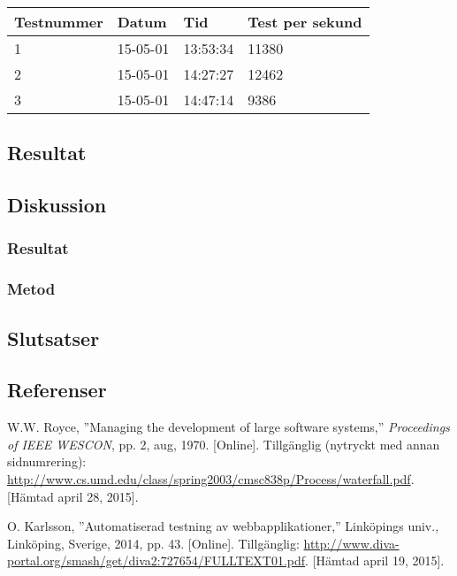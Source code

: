\begin{center}
  \begin{tabular}{| l | l | l | l |}
  \hline
  Testnummer & Datum & Tid & Test per sekund\\ \hline
  1 & 15-05-01 & 13:53:34 & 11380\\ \hline
  2 & 15-05-01 & 14:27:27 & 12462\\ \hline
  3 & 15-05-01 & 14:47:14 & 9386\\ \hline 
  \end{tabular}
\end{center}

\subsection{Resultat}
\subsection{Diskussion}
\subsubsection{Resultat}
\subsubsection{Metod}
\subsection{Slutsatser}
\subsection{Referenser}
\vspace{-9mm}
\renewcommand{\refname}{}
\begin{thebibliography}{9}

W.W. Royce, ''Managing the development of large software systems,''
\textit{Proceedings of IEEE WESCON}, pp. 2, aug, 1970.
[Online].
Tillgänglig (nytryckt med annan sidnumrering):
\url{http://www.cs.umd.edu/class/spring2003/cmsc838p/Process/waterfall.pdf}.
[Hämtad april 28, 2015].

O. Karlsson, ''Automatiserad testning av webbapplikationer,''
Linköpings univ., Linköping, Sverige, 2014, pp. 43.
[Online]. 
Tillgänglig: 
\url{http://www.diva-portal.org/smash/get/diva2:727654/FULLTEXT01.pdf}.
[Hämtad april 19, 2015].

\end{thebibliography}
